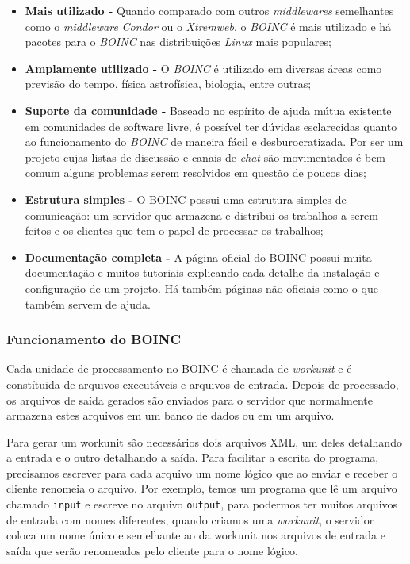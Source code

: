\begin{itemize}
  \item \textbf{Mais utilizado -} Quando comparado com outros \emph{middlewares} semelhantes como o \textit{middleware} 
\emph{Condor} ou o \emph{Xtremweb}, o \emph{BOINC} é mais utilizado e há pacotes para o \emph{BOINC} nas 
distribuições \emph{Linux} mais populares;
  \item \textbf{Amplamente utilizado -} O \emph{BOINC} é utilizado em diversas áreas como previsão do tempo, física
astrofísica, biologia, entre outras;
  \item \textbf{Suporte da comunidade -} Baseado no espírito de ajuda mútua existente em comunidades de software livre, é 
possível ter dúvidas esclarecidas quanto ao funcionamento do \emph{BOINC} de maneira fácil e desburocratizada. Por ser um projeto
cujas listas de discussão e canais de \textit{chat} são movimentados é bem comum alguns problemas serem resolvidos em questão de 
poucos dias;
  \item \textbf{Estrutura simples -} O BOINC possui uma estrutura simples de comunicação: um servidor que armazena e 
distribui os trabalhos a serem feitos e os clientes que tem o papel de processar os trabalhos;
  \item \textbf{Documentação completa -} A página oficial do BOINC possui muita documentação e muitos tutoriais explicando
cada detalhe da instalação e configuração de um projeto. Há também páginas não oficiais como o %
que também servem de ajuda.
\end{itemize}



\subsubsection{Funcionamento do BOINC}


Cada unidade de processamento no BOINC é chamada de \emph{workunit} e é constítuida de arquivos executáveis e 
arquivos de entrada. Depois de processado, os arquivos de saída gerados são enviados para o servidor que
normalmente armazena estes arquivos em um banco de dados ou em um arquivo.

Para gerar um workunit são necessários dois arquivos XML, um deles detalhando a entrada e o 
outro detalhando a saída. Para facilitar a escrita do programa, precisamos escrever para cada arquivo um nome lógico 
que ao enviar e receber o cliente renomeia o arquivo. Por exemplo, temos um programa que lê um arquivo chamado 
\verb#input# e escreve no arquivo \verb#output#, para podermos ter muitos arquivos de entrada com nomes diferentes, quando
criamos uma \emph{workunit}, o servidor coloca um nome único e semelhante ao da workunit nos arquivos de entrada e saída que serão renomeados
pelo cliente para o nome lógico.

